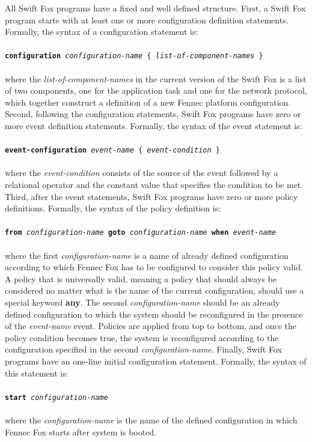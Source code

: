 \documentclass[11pt]{article}
\begin{document}
All Swift Fox programs have a fixed and well defined structure. First, a
Swift Fox program starts with at least one or more configuration definition
statements. Formally, the syntax of a configuration statement is:	\\
\\
\texttt{\textbf{configuration} \textit{configuration-name} 
  \{ \textit{list-of-component-names} \} }	 			\\
\\
where the \textit{list-of-component-names} in the current version of the
Swift Fox is a list of two components, one for the application task and one
for the network protocol, which together construct a definition of a new
Fennec platform configuration. Second, following the configuration
statements, Swift Fox programs have zero or more event definition
statements. Formally, the syntax of the event statement is:		\\
\\
\texttt{\textbf{event-configuration} \textit{event-name} 
  \{ \textit{event-condition} \} }					\\
\\
where the \textit{event-condition} consists of the source of the event
followed by a relational operator and the constant value that specifies the
condition to be met. Third, after the event statements, Swift Fox programs 
have zero or more policy definitions. Formally, the syntax of the policy
definition is:								\\
\\
\texttt{\textbf{from} \textit{configuration-name} \textbf{goto} 
  \textit{configuration-name} \textbf{when} \textit{event-name} }	\\
\\
where the first \textit{configuration-name} is a name of already defined
configuration according to which Fennec Fox has to be configured to
consider this policy valid. A policy that is universally valid, meaning a
policy that should always be considered no matter what is the name of the
current configuration, should use a special keyword \textbf{any}. The
second \textit{configuration-name} should be an already defined
configuration to which the system should be reconfigured in the presence of
the \textit{event-name} event. Policies are applied from top to bottom, and
once the policy condition becomes true, the system is reconfigured
according to the configuration specified in the second
\textit{configuration-name}. Finally, Swift Fox programs have an one-line
initial configuration statement. Formally, the syntax of this statement is:\\
\\
\texttt{\textbf{start} \textit{configuration-name} }			\\
\\
where the \textit{configuration-name} is the name of the defined
configuration in which Fennec Fox starts after system is booted.
\end{document}
